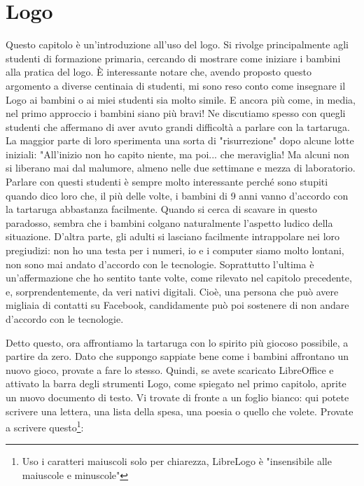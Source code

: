 \chapter{Logo} \label{cap:papert2}

Questo capitolo è un'introduzione all'uso del logo. Si rivolge principalmente agli studenti di formazione primaria, cercando di mostrare come iniziare i bambini alla pratica del logo. È interessante notare che, avendo proposto questo argomento a diverse centinaia di studenti, mi sono reso conto come insegnare il Logo ai bambini o ai miei studenti sia molto simile. E ancora più come, in media, nel primo approccio i bambini siano più bravi! Ne discutiamo spesso con quegli studenti che affermano di aver avuto grandi difficoltà a parlare con la tartaruga. La maggior parte di loro sperimenta una sorta di "risurrezione" dopo alcune lotte iniziali: "All'inizio non ho capito niente, ma poi... che meraviglia!  Ma alcuni non si liberano mai dal malumore, almeno nelle due settimane e mezza di laboratorio. Parlare con questi studenti è sempre molto interessante perché sono stupiti quando dico loro che, il più delle volte, i bambini di 9 anni vanno d'accordo con la tartaruga abbastanza facilmente. Quando si cerca di scavare in questo paradosso, sembra che i bambini colgano naturalmente l'aspetto ludico della situazione. D'altra parte, gli adulti si lasciano facilmente intrappolare nei loro pregiudizi: non ho una testa per i numeri, io e i computer siamo molto lontani, non sono mai andato d'accordo con le tecnologie. Soprattutto l'ultima è un'affermazione che ho sentito tante volte, come rilevato nel capitolo precedente, e, sorprendentemente, da veri nativi digitali. Cioè, una persona che può avere migliaia di contatti su Facebook, candidamente può poi sostenere di non andare d'accordo con le tecnologie.

Detto questo, ora affrontiamo la tartaruga con lo spirito più giocoso possibile, a partire da zero. Dato che suppongo sappiate bene come i bambini affrontano un nuovo gioco, provate a fare lo stesso.  Quindi, se avete scaricato LibreOffice e attivato la barra degli strumenti Logo, come spiegato nel primo capitolo, aprite un nuovo documento di testo. Vi trovate di fronte a un foglio bianco: qui potete scrivere una lettera, una lista della spesa, una poesia o quello che volete. Provate a scrivere questo\footnote{Uso i caratteri maiuscoli solo per chiarezza, LibreLogo è "insensibile alle maiuscole e minuscole"}:

\vskip 1cm

